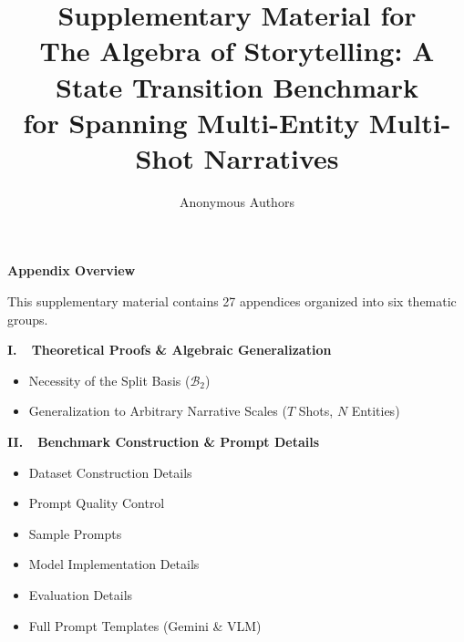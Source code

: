 \documentclass[sigconf,review,anonymous]{acmart}
\newcommand{\calB}{\mathcal{B}}
\begin{document}
\title{Supplementary Material for\\The Algebra of Storytelling: A State Transition Benchmark\\for Spanning Multi-Entity Multi-Shot Narratives}

\author{Anonymous Authors}

\maketitle

\appendix
\renewcommand{\thetheorem}{\Alph{section}.\arabic{theorem}}
\renewcommand{\thetable}{S\arabic{table}}
\renewcommand{\thefigure}{S\arabic{figure}}

\noindent\textbf{\large Appendix Overview}
\vspace{0.3em}

\noindent This supplementary material contains 27 appendices organized into six thematic groups.

\vspace{0.5em}
\noindent\textbf{I.\ \ Theoretical Proofs \& Algebraic Generalization}
\begin{itemize}[nosep,leftmargin=1.5em]
\item[\S\ref{app:necessity_b2}] Necessity of the Split Basis ($\calB_2$)
\item[\S\ref{app:generalization}] Generalization to Arbitrary Narrative Scales ($T$ Shots, $N$ Entities)
\end{itemize}

\vspace{0.3em}
\noindent\textbf{II.\ \ Benchmark Construction \& Prompt Details}
\begin{itemize}[nosep,leftmargin=1.5em]
\item[\S\ref{app:dataset}] Dataset Construction Details
\item[\S\ref{app:quality_control}] Prompt Quality Control
\item[\S\ref{app:prompts}] Sample Prompts
\item[\S\ref{app:models}] Model Implementation Details
\item[\S\ref{app:eval_details}] Evaluation Details
\item[\S\ref{app:full_prompts}] Full Prompt Templates (Gemini \& VLM)
\end{itemize}
\end{document}
